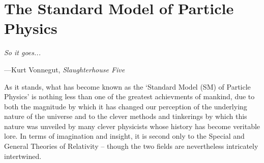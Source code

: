 \chapter{The Standard Model of Particle Physics}

\epigraph{\textit{So it goes...}}{---Kurt Vonnegut, \textit{Slaughterhouse
		Five}}

As it stands, what has become known as the `Standard Model (SM) of Particle Physics'
is nothing less than one of the greatest achievments of mankind, due to both
the magnitude by which it has changed our perception of the underlying
nature of the universe and to the clever methods and tinkerings by which this
nature was unveiled by many clever physicists whose history has become veritable lore.
In terms of imagination and insight, it is second only to the Special and General Theories of Relativity --
though the two fields are nevertheless intricately intertwined.

